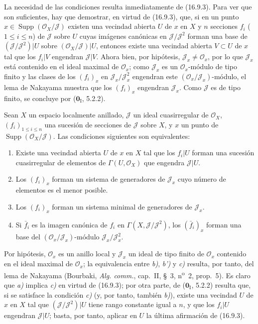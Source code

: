 La necesidad de las condiciones resulta inmediatamente de (16.9.3). Para ver
que son suficientes, hay que demostrar, en virtud de (16.9.3), que, si en un
punto $x\in\operatorname{Supp}(\mathcal{O}_X/\mathscr{J})$ existen una
vecindad abierta $U$ de $x$ en $X$ y $n$ secciones $f_i$
($1\leq i\leq n$) de $\mathscr{J}$ sobre $U$ cuyas imágenes canónicas en
$\mathscr{J}/\mathscr{J}^2$ forman una base de
$(\mathscr{J}/\mathscr{J}^2)|U$ sobre
$(\mathcal{O}_X/\mathscr{J})|U$, entonces existe una vecindad abierta
$V\subset U$ de $x$ tal que los $f_i|V$ engendran $\mathscr{J}|V$. Ahora
bien, por hipótesis, $\mathscr{J}_x\neq\mathcal{O}_x$, por lo que
$\mathscr{J}_x$ está contenido en el ideal maximal de $\mathcal{O}_x$; como
$\mathscr{J}_x$ es un $\mathcal{O}_x$-módulo de tipo finito y las clases de
los $(f_i)_x$ en $\mathscr{J}_x/\mathscr{J}_x^2$ engendran este
$(\mathcal{O}_x/\mathscr{J}_x)$-módulo, el lema de Nakayama muestra que los
$(f_i)_x$ engendran $\mathscr{J}_x$. Como $\mathscr{J}$ es de tipo finito,
se concluye por ($\mathbf{0}_{\mathrm I}$, 5.2.2).

\begin{corollary}[16.9.5]
\label{IV.16.9.5}
Sean $X$ un espacio localmente anillado, $\mathscr{J}$ un ideal cuasirregular
de $\mathcal{O}_X$, $(f_i)_{1\leq i\leq n}$ una sucesión de secciones de
$\mathscr{J}$ sobre $X$, y
$x$ un punto de $\operatorname{Supp}(\mathcal{O}_X/\mathscr{J})$. Las
condiciones siguientes son equivalentes:
\begin{enumerate}
  \item[\textup{a)}] Existe una vecindad abierta $U$ de $x$ en $X$ tal que los
  $f_i|U$ forman una sucesión cuasirregular de elementos de
  $\Gamma(U,\mathcal{O}_X)$ que engendra $\mathscr{J}|U$.
  \item[\textup{b)}] Los $(f_i)_x$ forman un sistema de generadores de
  $\mathscr{J}_x$ cuyo número de elementos es el menor posible.
  \item[\textup{b$'$)}] Los $(f_i)_x$ forman un sistema minimal de generadores de
  $\mathscr{J}_x$.
  \item[\textup{c)}] Si $\bar f_i$ es la imagen canónica de $f_i$ en
  $\Gamma(X,\mathscr{J}/\mathscr{J}^2)$, los $(\bar f_i)_x$ forman una base
  del $(\mathcal{O}_x/\mathscr{J}_x)$-módulo
  $\mathscr{J}_x/\mathscr{J}_x^2$.
\end{enumerate}
\end{corollary}

Por hipótesis, $\mathcal{O}_x$ es un anillo local y $\mathscr{J}_x$ un ideal
de tipo finito de $\mathcal{O}_x$ contenido en el ideal maximal de
$\mathcal{O}_x$; la equivalencia entre \emph{b)}, \emph{b')} y \emph{c)} resulta, por tanto, del
lema de Nakayama (Bourbaki, \emph{Alg. comm.}, cap.~II, §~3,
n\textsuperscript{o}~2, prop.~5). Es claro que \emph{a)} implica \emph{c)} en virtud de
(16.9.3); por otra parte, de ($\mathbf{0}_{\mathrm I}$, 5.2.2) resulta que, si se
satisface la condición \emph{c)} (y, por tanto, también \emph{b)}), existe una vecindad $U$
de $x$ en $X$ tal que $(\mathscr{J}/\mathscr{J}^2)|U$ tiene rango constante
igual a $n$, y que los $f_i|U$ engendran $\mathscr{J}|U$; basta, por tanto,
aplicar en $U$ la última afirmación de (16.9.3).

